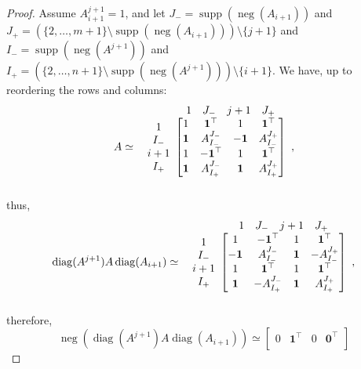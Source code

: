 \documentclass[11pt,a4paper]{amsart}
\theoremstyle{plain}
\theoremstyle{definition}
\DeclareMathOperator{\supp}{supp}
\DeclareMathOperator{\diag}{diag}
\DeclareMathOperator{\nega}{neg}
\begin{document}
\begin{proof}
Assume $A_{i+1}^{j+1}=1$, and let $J_{-} = \supp(\nega(A_{i+1}))$ and $J_{+} = (\{2,\ldots,m+1\}\setminus \supp(\nega(A_{i+1})))\setminus\{j+1\}$ and 
$I_{-} = \supp(\nega(A^{j+1}))$ and $I_{+} = (\{2,\ldots,n+1\}\setminus \supp(\nega(A^{j+1})))\setminus\{i+1\}$.
We have, up to reordering the rows and columns: 
$$A \simeq \begin{array}{c@{}c}
& \begin{array}{cccc}
	1 & J_-& j+1 & J_+
\end{array}\\
\begin{array}{c}
	1\\I_- \\ i+1 \\ I_+
\end{array} &\begin{bmatrix}
	1& \mathbf{1}^\top &1&\mathbf{1}^\top\\ 
	\mathbf{1} & A_{I_-}^{J_-} & \mathbf{-1} &  A_{I_-}^{J_+}\\
	1 & \mathbf{-1}^\top & 1 & \mathbf{1}^\top \\
	\mathbf{1}& A_{I_+}^{J_-} & \mathbf{1} & A_{I_+}^{J_+}
\end{bmatrix}\\&\end{array},$$
thus,
$$\diag(A^{j+1})A\diag(A_{i+1}) \simeq \begin{array}{c@{}c}
& \begin{array}{cccc}
	1 & J_-& j+1 & J_+
\end{array}\\
\begin{array}{c}
	1\\I_- \\ i+1 \\ I_+
\end{array} &\begin{bmatrix}
	1 & \mathbf{-1}^\top & 1 & \mathbf{1}^\top \\
	\mathbf{-1} & A_{I_-}^{J_-} & \mathbf{1} & - A_{I_-}^{J_+}\\
	1& \mathbf{1}^\top &1&\mathbf{1}^\top\\ 
	\mathbf{1}& -A_{I_+}^{J_-} & \mathbf{1} & A_{I_+}^{J_+}
\end{bmatrix}\\&\end{array},$$
therefore,
$$\nega (\diag(A^{j+1})A\diag(A_{i+1})) \simeq\begin{bmatrix}
0 &\mathbf{1}^\top & 0& \mathbf{0}^\top\\

\end{bmatrix}$$
\end{proof}
\end{document}
